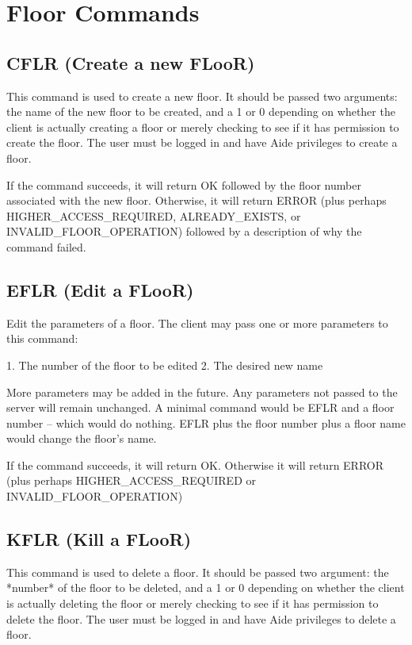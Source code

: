 \section{Floor Commands}



\subsection{CFLR (Create a new FLooR)}

 This command is used to create a new floor.  It should be passed two
arguments: the name of the new floor to be created, and a 1 or 0 depending
on whether the client is actually creating a floor or merely checking to
see if it has permission to create the floor.   The user must be logged in
and have Aide privileges to create a floor.

 If the command succeeds, it will return OK followed by the floor number
associated with the new floor.  Otherwise, it will return ERROR (plus perhaps
HIGHER_ACCESS_REQUIRED, ALREADY_EXISTS, or INVALID_FLOOR_OPERATION)
followed by a description of why the command failed.



\subsection{EFLR (Edit a FLooR)}

 Edit the parameters of a floor.  The client may pass one or more parameters
to this command:

 1. The number of the floor to be edited
 2. The desired new name

 More parameters may be added in the future.  Any parameters not passed to
the server will remain unchanged.  A minimal command would be EFLR and a
floor number -- which would do nothing.  EFLR plus the floor number plus a
floor name would change the floor's name.

 If the command succeeds, it will return OK.  Otherwise it will return
ERROR (plus perhaps HIGHER_ACCESS_REQUIRED or INVALID_FLOOR_OPERATION)



\subsection{KFLR (Kill a FLooR)}

 This command is used to delete a floor.  It should be passed two
argument: the *number* of the floor to be deleted, and a 1 or 0 depending
on whether the client is actually deleting the floor or merely checking to
see if it has permission to delete the floor.  The user must be logged in
and have Aide privileges to delete a floor.

